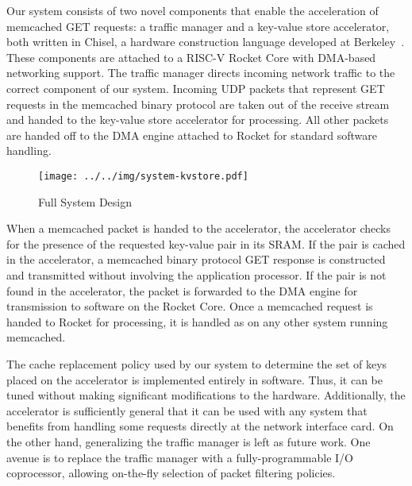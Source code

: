 Our system consists of two novel components that enable the acceleration of 
memcached GET requests: a traffic manager and a key-value store accelerator, 
both written in Chisel, a hardware construction language developed at Berkeley~\cite{chisel}.
These components are attached to a RISC-V Rocket Core with DMA-based networking 
support. The traffic manager directs incoming network traffic to the correct 
component of our system. Incoming UDP packets that represent GET requests in
the memcached binary protocol are taken out of the receive stream and handed to
the key-value store accelerator for processing. All other packets are handed
off to the DMA engine attached to Rocket for standard software handling.

\begin{figure}[t]
\begin{center}
\texttt{[image: ../../img/system-kvstore.pdf]}
\caption{Full System Design}
\label{fig:full-sys}
\end{center}
\end{figure}

When a memcached packet is handed to the accelerator, the accelerator checks 
for the presence of the requested key-value pair in its SRAM. If the pair is
cached in the accelerator, a memcached binary protocol GET response is 
constructed and transmitted without involving the application processor. If the
pair is not found in the accelerator, the packet is forwarded to the DMA engine
for transmission to software on the Rocket Core. Once a memcached
request is handed to Rocket for processing, it is handled as on any other
system running memcached.

The cache replacement policy used by our system to determine the set of keys
placed on the accelerator is implemented entirely in software. Thus, it can be
tuned without making significant modifications to the hardware. Additionally,
the accelerator is sufficiently general that it can be used with any system that
benefits from handling some requests directly at the network interface card.
On the other hand, generalizing the traffic manager is left as future work. One
avenue is to replace the traffic manager with a fully-programmable I/O
coprocessor, allowing on-the-fly selection of packet filtering policies.
